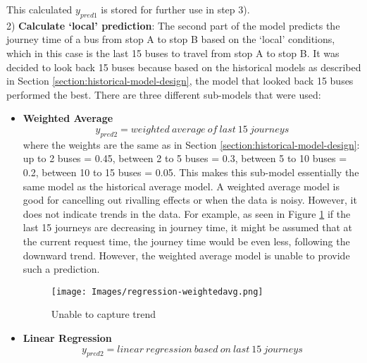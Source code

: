 This calculated $y_{pred1}$ is stored for further use in step 3). \\

2) \textbf{Calculate `local' prediction}: The second part of the model predicts the journey time of a bus from stop A to stop B based on the `local' conditions, which in this case is the last 15 buses to travel from stop A to stop B. It was decided to look back 15 buses because based on the historical models as described in Section \ref{section:historical-model-design}, the model that looked back 15 buses performed the best. There are three different sub-models that were used: \\

\begin{itemize}
    \item \textbf{Weighted Average}
    \begin{equation}
        y_{pred2} = weighted\ average\ of\ last\ 15\ journeys
    \end{equation}
    where the weights are the same as in Section \ref{section:historical-model-design}: up to 2 buses = 0.45, between 2 to 5 buses = 0.3, between 5 to 10 buses = 0.2, between 10 to 15 buses = 0.05. This makes this sub-model essentially the same model as the historical average model. A weighted average model is good for cancelling out rivalling effects or when the data is noisy. However, it does not indicate trends in the data. For example, as seen in Figure \ref{fig:weighted-avg-regression} if the last 15 journeys are decreasing in journey time, it might be assumed that at the current request time, the journey time would be even less, following the downward trend. However, the weighted average model is unable to provide such a prediction.
    
    \begin{figure}[H]
    \begin{center}
        \texttt{[image: Images/regression-weightedavg.png]}
        \caption{Unable to capture trend}
        \label{fig:weighted-avg-regression}
    \end{center}
    \end{figure}
    
    \item \textbf{Linear Regression}
    \begin{equation}
        y_{pred2} = linear\ regression\ based\ on\ last\ 15\ journeys
    \end{equation}
    

\end{itemize}
